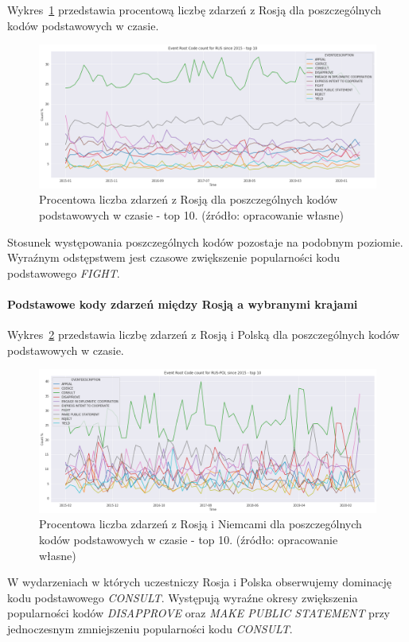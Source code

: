 \documentclass[11pt]{report}
\begin{document}
    Wykres~\ref{fig:RUSPERCpercinTIME} przedstawia procentową liczbę zdarzeń z Rosją dla poszczególnych kodów podstawowych w czasie.
    \begin{figure}[!htp]
        \centering
        \includegraphics[width=\linewidth]{fig/RUS/RUSERCpercinTIME.png}
        \caption{Procentowa liczba zdarzeń z Rosją dla poszczególnych kodów podstawowych w czasie - top 10. (źródło: opracowanie własne)}
        \label{fig:RUSPERCpercinTIME}
    \end{figure}
    Stosunek występowania poszczególnych kodów pozostaje na podobnym poziomie.
    Wyraźnym odstępstwem jest czasowe zwiększenie popularności kodu podstawowego \textit{FIGHT}.

    \paragraph{Podstawowe kody zdarzeń między Rosją a wybranymi krajami}

    Wykres~\ref{fig:RUSPOLERC} przedstawia liczbę zdarzeń z Rosją i Polską dla poszczególnych kodów podstawowych w czasie.
    \begin{figure}[!htp]
        \centering
        \includegraphics[width=\linewidth]{fig/RUS/RUSPOLERCperc.png}
        \caption{Procentowa liczba zdarzeń z Rosją i Niemcami dla poszczególnych kodów podstawowych w czasie - top 10. (źródło: opracowanie własne)}
        \label{fig:RUSPOLERC}
    \end{figure}
    W wydarzeniach w których uczestniczy Rosja i Polska obserwujemy dominację kodu podstawowego \textit{CONSULT}.
    Występują wyraźne okresy zwiększenia popularności kodów \textit{DISAPPROVE} oraz \textit{MAKE PUBLIC STATEMENT} przy jednoczesnym zmniejszeniu popularności kodu \textit{CONSULT}.
\end{document}
